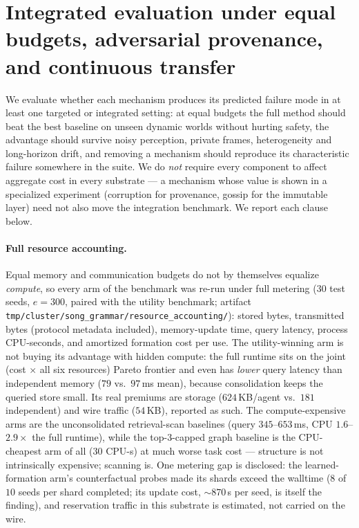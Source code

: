 \documentclass{article}
\begin{document}
\section{Integrated evaluation under equal budgets, adversarial
provenance, and continuous transfer}
\label{p5:sec:acceptance}

We evaluate whether each mechanism produces its predicted failure mode
in at least one targeted or integrated setting: at equal budgets the
full method should beat the best baseline on unseen dynamic worlds
without hurting safety, the advantage should survive noisy perception,
private frames, heterogeneity and long-horizon drift, and removing a
mechanism should reproduce its characteristic failure somewhere in the
suite. We do \emph{not} require every component to affect aggregate
cost in every substrate --- a mechanism whose value is shown in a
specialized experiment (corruption for provenance, gossip for the
immutable layer) need not also move the integration benchmark. We
report each clause below.

\paragraph{Full resource accounting.} Equal memory and communication
budgets do not by themselves equalize \emph{compute}, so every arm of
the benchmark was re-run under full metering ($30$ test seeds,
$e{=}300$, paired with the utility benchmark; artifact
\texttt{tmp/cluster/song\_grammar/resource\_accounting/}): stored
bytes, transmitted bytes (protocol metadata included), memory-update
time, query latency, process CPU-seconds, and amortized formation
cost per use. The utility-winning arm is not buying its advantage
with hidden compute: the full runtime sits on the joint
(cost $\times$ all six resources) Pareto frontier and even has
\emph{lower} query latency than independent memory ($79$ vs.\
$97$\,ms mean), because consolidation keeps the queried store small.
Its real premiums are storage ($624$\,KB/agent vs.\ $181$ independent)
and wire traffic ($54$\,KB), reported as such. The compute-expensive
arms are the unconsolidated retrieval-scan baselines (query
$345$--$653$\,ms, CPU $1.6$--$2.9\times$ the full runtime), while the
top-3-capped graph baseline is the CPU-cheapest arm of all ($30$
CPU-s) at much worse task cost --- structure is not intrinsically
expensive; scanning is. One metering gap is disclosed: the
learned-formation arm's counterfactual probes made its shards exceed
the walltime ($8$ of $10$ seeds per shard completed; its update cost,
${\sim}870$\,s per seed, is itself the finding), and reservation
traffic in this substrate is estimated, not carried on the wire.
\end{document}

